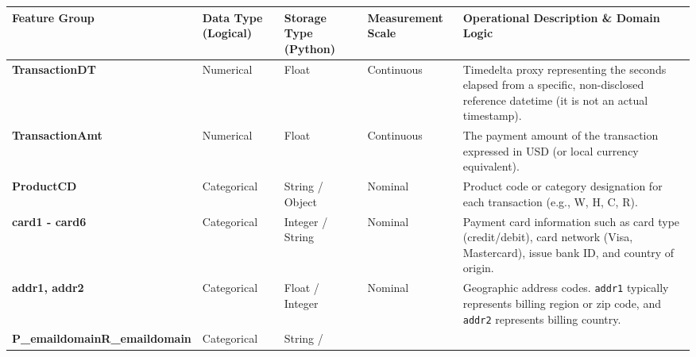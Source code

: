 \documentclass[11pt]{article}
\begin{document}
{\def\LTcaptype{none} %
\begin{longtable}[]{@{}
  >{\raggedright\arraybackslash}p{}
  >{\raggedright\arraybackslash}p{}
  >{\raggedright\arraybackslash}p{}
  >{\raggedright\arraybackslash}p{}
  >{\raggedright\arraybackslash}p{}@{}}
\toprule\noalign{}
\begin{minipage}[b]{\linewidth}\raggedright
Feature Group
\end{minipage} & \begin{minipage}[b]{\linewidth}\raggedright
Data Type (Logical)
\end{minipage} & \begin{minipage}[b]{\linewidth}\raggedright
Storage Type (Python)
\end{minipage} & \begin{minipage}[b]{\linewidth}\raggedright
Measurement Scale
\end{minipage} & \begin{minipage}[b]{\linewidth}\raggedright
Operational Description \& Domain Logic
\end{minipage} \\
\midrule\noalign{}
\endhead
\bottomrule\noalign{}
\endlastfoot
\textbf{TransactionDT} & Numerical & Float & Continuous & Timedelta
proxy representing the seconds elapsed from a specific, non-disclosed
reference datetime (it is not an actual timestamp). \\
\textbf{TransactionAmt} & Numerical & Float & Continuous & The payment
amount of the transaction expressed in USD (or local currency
equivalent). \\
\textbf{ProductCD} & Categorical & String / Object & Nominal & Product
code or category designation for each transaction (e.g., W, H, C, R). \\
\textbf{card1 - card6} & Categorical & Integer / String & Nominal &
Payment card information such as card type (credit/debit), card network
(Visa, Mastercard), issue bank ID, and country of origin. \\
\textbf{addr1, addr2} & Categorical & Float / Integer & Nominal &
Geographic address codes. \texttt{addr1} typically represents billing
region or zip code, and \texttt{addr2} represents billing country. \\
\textbf{P\_emaildomain}\textbf{R\_emaildomain} & Categorical & String /

\end{longtable}}
\end{document}
